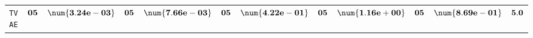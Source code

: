 \begin{xltabular}{\textwidth}{l||cC|cC|cC|cC|cC||c}
	\texttt{TVAE} & $\bf 05$ & $\bf \num{3.24e-03}$ & $\bf 05$ & $\bf \num{7.66e-03}$ & $\bf 05$ & $\bf \num{4.22e-01}$ & $\bf 05$ & $\bf \num{1.16e+00}$ & $\bf 05$ & $\bf \num{8.69e-01}$ & $\bf 5.0$  \\
\end{xltabular}
